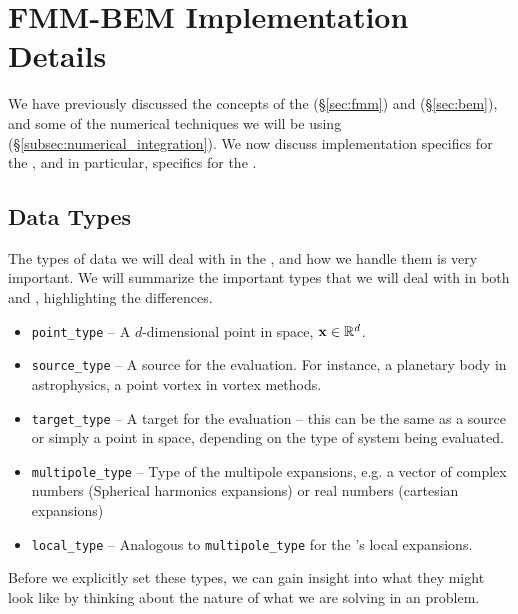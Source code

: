 
\chapter{FMM-BEM Implementation Details}
\label{chapter:fmm_implementation}
\thispagestyle{myheadings}

\graphicspath{{FMM_Implementation/}}

We have previously discussed the concepts of the {\fmm} (\S\ref{sec:fmm}) and {\bem} (\S\ref{sec:bem}), and some of the numerical techniques we will be using (\S\ref{subsec:numerical_integration}). We now  discuss implementation specifics for the {\fmm}, and in particular, specifics for the {\fmmbem}.

\section{Data Types}\label{sec:fmm_data_types}

The types of data we will deal with in the {\fmmbem}, and how we handle them is very important. We will summarize the important types that we will deal with in both {\fmm} and {\fmmbem}, highlighting the differences.

\begin{itemize}
\item \lstinline|point_type| -- A $d$-dimensional point in space, $\mathbf{x} \in \mathbb{R}^{d}$.
\item \lstinline|source_type| -- A source for the evaluation. For instance, a planetary body in astrophysics, a point vortex in vortex methods.
\item \lstinline|target_type| -- A target for the evaluation -- this can be the same as a source or simply a point in space, depending on the type of system being evaluated.
\item \lstinline|multipole_type| -- Type of the multipole expansions, e.g. a vector of complex numbers (Spherical harmonics expansions) or real numbers (cartesian expansions)
\item \lstinline|local_type| -- Analogous to \lstinline|multipole_type| for the {\fmm}'s local expansions.
\end{itemize}

Before we explicitly set these types, we can gain insight into what they might look like by thinking about the nature of what we are solving in an {\fmmbem} problem.

